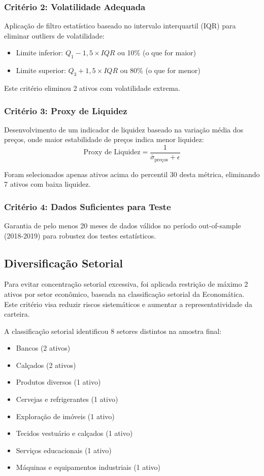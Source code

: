 \subsubsection{Critério 2: Volatilidade Adequada}
Aplicação de filtro estatístico baseado no intervalo interquartil (IQR) para eliminar outliers de volatilidade:
\begin{itemize}
    \item Limite inferior: $Q_1 - 1,5 \times IQR$ ou 10\% (o que for maior)
    \item Limite superior: $Q_3 + 1,5 \times IQR$ ou 80\% (o que for menor)
\end{itemize}

Este critério eliminou 2 ativos com volatilidade extrema.

\subsubsection{Critério 3: Proxy de Liquidez}
Desenvolvimento de um indicador de liquidez baseado na variação média dos preços, onde maior estabilidade de preços indica menor liquidez:
$$\text{Proxy de Liquidez} = \frac{1}{\bar{\sigma}_{\text{preços}} + \epsilon}$$

Foram selecionados apenas ativos acima do percentil 30 desta métrica, eliminando 7 ativos com baixa liquidez.

\subsubsection{Critério 4: Dados Suficientes para Teste}
Garantia de pelo menos 20 meses de dados válidos no período out-of-sample (2018-2019) para robustez dos testes estatísticos.

\subsection{Diversificação Setorial}

Para evitar concentração setorial excessiva, foi aplicada restrição de máximo 2 ativos por setor econômico, baseada na classificação setorial da Economática. Este critério visa reduzir riscos sistemáticos e aumentar a representatividade da carteira.

A classificação setorial identificou 8 setores distintos na amostra final:
\begin{itemize}
    \item Bancos (2 ativos)
    \item Calçados (2 ativos) 
    \item Produtos diversos (1 ativo)
    \item Cervejas e refrigerantes (1 ativo)
    \item Exploração de imóveis (1 ativo)
    \item Tecidos vestuário e calçados (1 ativo)
    \item Serviços educacionais (1 ativo)
    \item Máquinas e equipamentos industriais (1 ativo)
\end{itemize}

